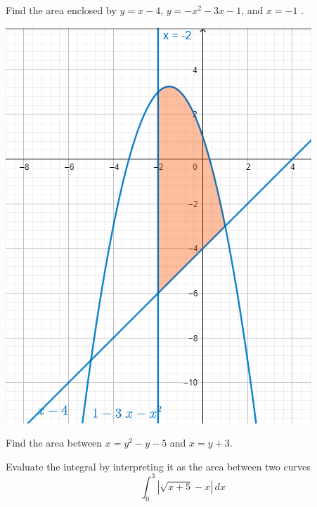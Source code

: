 \begin{example}

Find the area enclosed by \(y=x-4\), \(y=-x^2 - 3x - 1\), and \(x= - 1\) .

\includegraphics[scale=0.4]{img/image-20200506104639920.png}

\end{example}
\vspace*{6\baselineskip}





\begin{example}

Find the area between \(x=y^2-y-5\) and \(x=y+3\).

\end{example}
\vspace*{6\baselineskip}


\begin{example}

Evaluate the integral by interpreting it as the area between two curves
\[\int_0^3|\sqrt{x+5}-x|\, dx\]

\end{example}
\vspace*{6\baselineskip}


